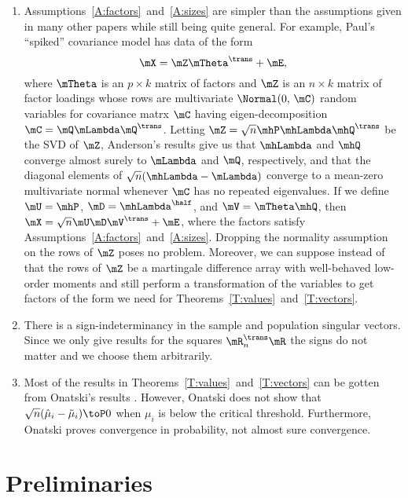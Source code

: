 \begin{enumerate}
    
\item
Assumptions~\ref{A:factors}~and~\ref{A:sizes} are simpler than the assumptions given in many other papers while still being quite general.  For example, Paul's ``spiked'' covariance model has data of the form
\[
    \mX = \mZ \mTheta^\trans + \mE,
\]
where $\mTheta$ is an $p \times k$ matrix of factors and $\mZ$ is an $n\times k$ matrix of factor loadings whose rows are \iid multivariate $\Normal(0,\, \mC)$ random variables for covariance matrx $\mC$ having eigen-decomposition $\mC = \mQ \mLambda \mQ^\trans$.  Letting $\mZ = \sqrt{n} \mhP \mhLambda \mhQ^\trans$ be the SVD of $\mZ$, Anderson's results \cite{anderson1963atp} give us that $\mhLambda$ and $\mhQ$ converge almost surely to $\mLambda$ and $\mQ$, respectively, and that the diagonal elements of $\sqrt{n} (\mhLambda - \mLambda)$ converge to a mean-zero multivariate normal whenever $\mC$ has no repeated eigenvalues.  If we define $\mU = \mhP$, $\mD = \mhLambda^\half$, and $\mV = \mTheta \mhQ$, then $\mX = \sqrt{n} \mU \mD \mV^\trans + \mE$, where the factors satisfy Assumptions~\ref{A:factors}~and~\ref{A:sizes}.  Dropping the normality assumption on the rows of $\mZ$ poses no problem.  Moreover, we can suppose instead of \iid that the rows of $\mZ$ be a martingale difference array with well-behaved low-order moments and still perform a transformation of the variables to get factors of the form we need for Theorems~\ref{T:values}~and~\ref{T:vectors}.

\item
There is a sign-indeterminancy in the sample and population singular vectors. Since we only give results for the squares $\mR_n^\trans \mR$ the signs do not matter and we choose them arbitrarily.

\item 
Most of the results in Theorems~\ref{T:values}~and~\ref{T:vectors} can be gotten from Onatski's results \cite{onatski}.   However, Onatski does not show that $\sqrt{n} (\hat \mu_i - \tilde \mu_i) \toP 0$ when $\mu_i$ is below the critical threshold.  Furthermore, Onatski proves convergence in probability, not almost sure convergence.

\end{enumerate}

\section{Preliminaries}\label{S:lowrank-preliminaries}


